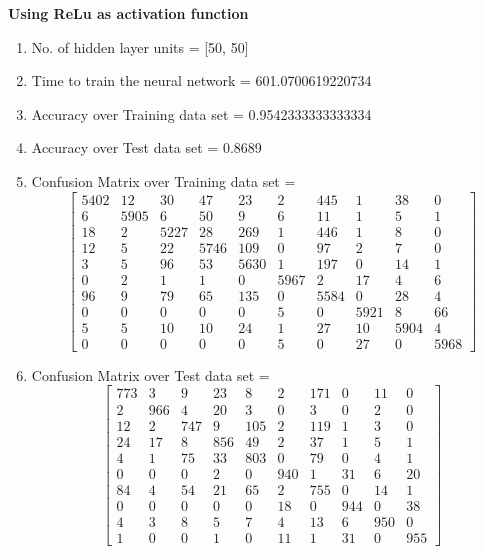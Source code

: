 \documentclass[11pt]{article}
\begin{document}
\hline
\vspace{3mm}
\textbf{Using ReLu as activation function}
\begin{enumerate}
\item No. of hidden layer units = [50, 50]
\item Time to train the neural network = 601.0700619220734
\item Accuracy over Training data set = 0.9542333333333334
\item Accuracy over Test data set = 0.8689
\item Confusion Matrix over Training data set = 
\begin{equation}
  \begin{bmatrix}
5402 & 12 & 30 & 47 & 23 & 2 & 445 & 1 & 38 & 0\\
6 & 5905 & 6 & 50 & 9 & 6 & 11 & 1 & 5 & 1\\
18 & 2 & 5227 & 28 & 269 & 1 & 446 & 1 & 8 & 0\\
12 & 5 & 22 & 5746 & 109 & 0 & 97 & 2 & 7 & 0\\
3 & 5 & 96 & 53 & 5630 & 1 & 197 & 0 & 14 & 1\\
0 & 2 & 1 & 1 & 0 & 5967 & 2 & 17 & 4 & 6\\
96 & 9 & 79 & 65 & 135 & 0 & 5584 & 0 & 28 & 4\\
0 & 0 & 0 & 0 & 0 & 5 & 0 & 5921 & 8 & 66\\
5 & 5 & 10 & 10 & 24 & 1 & 27 & 10 & 5904 & 4\\
0 & 0 & 0 & 0 & 0 & 5 & 0 & 27 & 0 & 5968
  \end{bmatrix}
\end{equation}
\item Confusion Matrix over Test data set = 
\begin{equation}
  \begin{bmatrix}
773 & 3 & 9 & 23 & 8 & 2 & 171 & 0 & 11 & 0\\
2 & 966 & 4 & 20 & 3 & 0 & 3 & 0 & 2 & 0\\
12 & 2 & 747 & 9 & 105 & 2 & 119 & 1 & 3 & 0\\
24 & 17 & 8 & 856 & 49 & 2 & 37 & 1 & 5 & 1\\
4 & 1 & 75 & 33 & 803 & 0 & 79 & 0 & 4 & 1\\
0 & 0 & 0 & 2 & 0 & 940 & 1 & 31 & 6 & 20\\
84 & 4 & 54 & 21 & 65 & 2 & 755 & 0 & 14 & 1\\
0 & 0 & 0 & 0 & 0 & 18 & 0 & 944 & 0 & 38\\
4 & 3 & 8 & 5 & 7 & 4 & 13 & 6 & 950 & 0\\
1 & 0 & 0 & 1 & 0 & 11 & 1 & 31 & 0 & 955
  \end{bmatrix}
\end{equation}
\end{enumerate}
\end{document}
